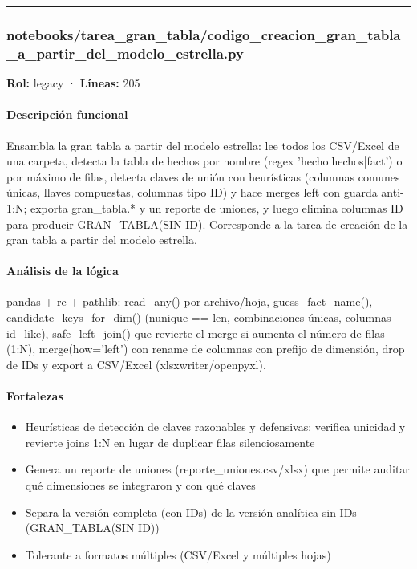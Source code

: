 \medskip
\hrule

\subsubsection{notebooks/tarea\_gran\_tabla/codigo\_creacion\_gran\_tabla\_a\_partir\_del\_modelo\_estrella.py}
\textbf{Rol:} legacy · \textbf{Líneas:} 205

\paragraph{Descripción funcional}
Ensambla la gran tabla a partir del modelo estrella: lee todos los CSV/Excel de una carpeta, detecta la tabla de hechos por nombre (regex 'hecho|hechos|fact') o por máximo de filas, detecta claves de unión con heurísticas (columnas comunes únicas, llaves compuestas, columnas tipo ID) y hace merges left con guarda anti-1:N; exporta gran\_tabla.* y un reporte de uniones, y luego elimina columnas ID para producir GRAN\_TABLA(SIN ID). Corresponde a la tarea de creación de la gran tabla a partir del modelo estrella.

\paragraph{Análisis de la lógica}
pandas + re + pathlib: read\_any() por archivo/hoja, guess\_fact\_name(), candidate\_keys\_for\_dim() (nunique == len, combinaciones únicas, columnas id\_like), safe\_left\_join() que revierte el merge si aumenta el número de filas (1:N), merge(how='left') con rename de columnas con prefijo de dimensión, drop de IDs y export a CSV/Excel (xlsxwriter/openpyxl).

\paragraph{Fortalezas}
\begin{itemize}
  \item Heurísticas de detección de claves razonables y defensivas: verifica unicidad y revierte joins 1:N en lugar de duplicar filas silenciosamente
  \item Genera un reporte de uniones (reporte\_uniones.csv/xlsx) que permite auditar qué dimensiones se integraron y con qué claves
  \item Separa la versión completa (con IDs) de la versión analítica sin IDs (GRAN\_TABLA(SIN ID))
  \item Tolerante a formatos múltiples (CSV/Excel y múltiples hojas)
\end{itemize}

